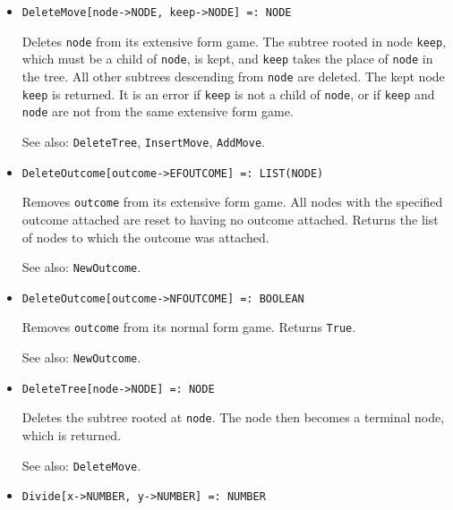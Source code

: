 \begin{itemize}
\item{}
\protect \large \begin{verbatim}
DeleteMove[node->NODE, keep->NODE] =: NODE 
\end{verbatim}\normalsize

\bd
Deletes \verb+node+ from its extensive form game.  The
subtree rooted in node \verb+keep+, which must be a child of
\verb+node+, is kept, and \verb+keep+ takes the place of \verb+node+ in
the tree.  All other subtrees descending from \verb+node+ are deleted.
The kept node \verb+keep+ is returned.  It is an error if \verb+keep+
is not a child of \verb+node+, or if \verb+keep+ and \verb+node+ are not
from the same extensive form game.
\item [See also:] \verb+DeleteTree+, \verb+InsertMove+, \verb+AddMove+.
\ed

\item{}
\protect \large \begin{verbatim}
DeleteOutcome[outcome->EFOUTCOME] =: LIST(NODE) 
\end{verbatim}\normalsize

\bd
Removes \verb+outcome+ from its extensive
form game.  All nodes with the specified outcome attached are reset to
having no outcome attached.  Returns the list of nodes to which
the outcome was attached.
\item [See also:] \verb+NewOutcome+.
\ed

\item{}
\protect \large \begin{verbatim}
DeleteOutcome[outcome->NFOUTCOME] =: BOOLEAN 
\end{verbatim}\normalsize

\bd
Removes \verb+outcome+ from its normal form game.  Returns \verb+True+.
\item [See also:] \verb+NewOutcome+.
\ed


\item{}
\protect \large \begin{verbatim}
DeleteTree[node->NODE] =: NODE 
\end{verbatim}\normalsize

\bd
Deletes the subtree rooted at \verb+node+.  The
node then becomes a terminal node, which is returned.
\item [See also:] \verb+DeleteMove+.
\ed

\item{} 
\protect \large \begin{verbatim}
Divide[x->NUMBER, y->NUMBER] =: NUMBER 
\end{verbatim} \normalsize


\end{itemize}
